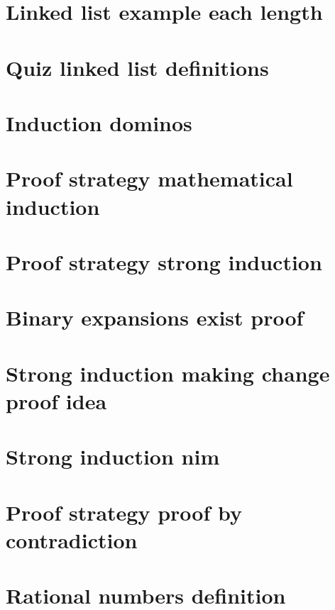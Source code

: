 \section*{Linked list example each length}

\vfill
\section*{Quiz linked list definitions}

\vfill
\section*{Induction dominos}

\vfill
\section*{Proof strategy mathematical induction}

\vfill
\section*{Proof strategy strong induction}

\vfill
\section*{Binary expansions exist proof}

\vfill
\section*{Strong induction making change proof idea}

\vfill
\section*{Strong induction nim}

\vfill
\section*{Proof strategy proof by contradiction}

\vfill
\section*{Rational numbers definition}

\vfill
